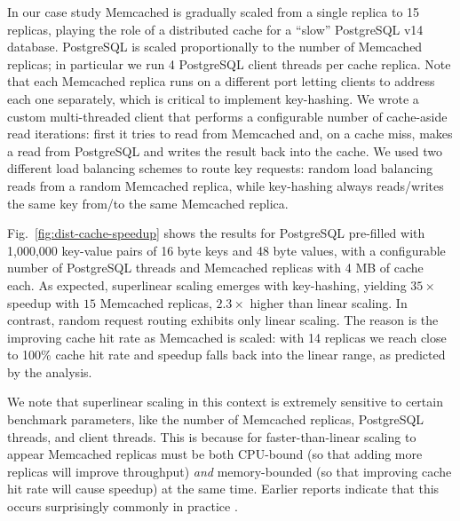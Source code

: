 In our case study Memcached is gradually scaled from a single replica to 15 replicas, playing the role of a distributed cache for a ``slow'' PostgreSQL v14 database. PostgreSQL is scaled proportionally to the number of Memcached replicas; in particular we run 4 PostgreSQL client threads per cache replica. Note that each Memcached replica runs on a different port letting clients to address each one separately, which is critical to implement key-hashing. We wrote a custom multi-threaded client that performs a configurable number of cache-aside read iterations: first it tries to read from Memcached and, on a cache miss, makes a read from PostgreSQL and writes the result back into the cache. We used two different load balancing schemes to route key requests: random load balancing reads from a random Memcached replica, while key-hashing always reads\slash writes the same key from\slash to the same Memcached replica.

Fig.~\ref{fig:dist-cache-speedup} shows the results for PostgreSQL pre-filled with 1,000,000 key-value pairs of 16 byte keys and 48 byte values, with a configurable number of PostgreSQL threads and Memcached replicas with 4 MB of cache each. As expected, superlinear scaling emerges with key-hashing, yielding $35\times$ speedup with $15$ Memcached replicas, $2.3\times$ higher than linear scaling. In contrast, random request routing exhibits only linear scaling. The reason is the improving cache hit rate as Memcached is scaled: with 14 replicas we reach close to 100\% cache hit rate and speedup falls back into the linear range, as predicted by the analysis.

We note that superlinear scaling in this context is extremely sensitive to certain benchmark parameters, like the number of Memcached replicas, PostgreSQL threads, and client threads. This is because for faster-than-linear scaling to appear Memcached replicas must be both CPU-bound (so that adding more replicas will improve throughput) \emph{and} memory-bounded (so that improving cache hit rate will cause speedup) at the same time. Earlier reports indicate that this occurs surprisingly commonly in practice \cite{dobb-1, dobb-2, 7733347, 80148, 556383, scalability-analyzed}.

